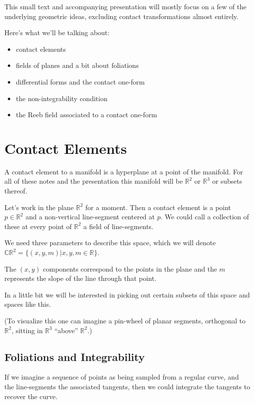 \documentclass{article}
\begin{document}
This small text and accompanying presentation will mostly focus on a few of the
underlying geometric ideas, excluding contact transformations almost entirely.

Here's what we'll be talking about:

\begin{itemize}
\item contact elements
\item fields of planes and a bit about foliations
\item differential forms and the contact one-form
\item the non-integrability condition
\item the Reeb field associated to a contact one-form
\end {itemize}


\section {Contact Elements}

A contact element to a manifold is a hyperplane at a point of the manifold. For
all of these notes and the presentation this manifold will be $\mathbb{R}^{2}$
or $\mathbb{R}^{3}$ or subsets thereof.

Let's work in the plane $\mathbb{R}^{2}$ for a moment. Then a contact element is a point $p
\in \mathbb{R}^{2}$ and a non-vertical line-segment centered at $p$. We could
call a collection of these at every point of $\mathbb{R}^{2}$ a field of line-segments.

We need three parameters to describe this space, which we will denote
$\mathbb{CR}^{2} = \{ (x, y, m) | x, y, m \in \mathbb{R} \}$.

The $(x, y)$ components correspond to the points in the plane and the $m$
represents the slope of the line through that point.

In a little bit we will be interested in picking out certain subsets of this
space and spaces like this.

(To visualize this one can imagine a pin-wheel of planar segments, orthogonal to
$\mathbb{R}^{2}$, sitting in $\mathbb{R}^{3}$ ``above'' $\mathbb{R}^{2}$.)

\subsection {Foliations and Integrability}

If we imagine a sequence of points as being sampled from a regular curve, and the line-segments
the associated tangents, then we could integrate the tangents to recover the curve.
\end{document}
